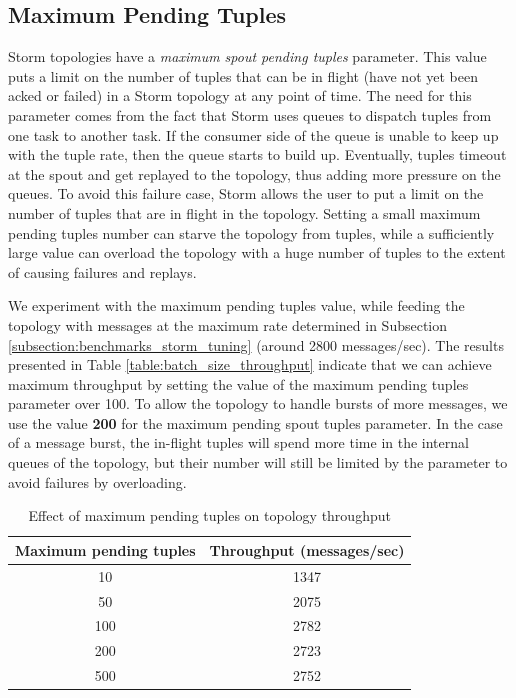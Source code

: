 \subsection{Maximum Pending Tuples}

Storm topologies have a \emph{maximum spout pending tuples} parameter. This value puts a limit on the number of tuples that can be in flight (have not yet been acked or failed) in a Storm topology at any point of time. The need for this parameter comes from the fact that Storm uses queues to dispatch tuples from one task to another task. If the consumer side of the queue is unable to keep up with the tuple rate, then the queue starts to build up. Eventually, tuples timeout at the spout and get replayed to the topology, thus adding more pressure on the queues. To avoid this failure case, Storm allows the user to put a limit on the number of tuples that are in flight in the topology. Setting a small maximum pending tuples number can starve the topology from tuples, while a sufficiently large value can overload the topology with a huge number of tuples to the extent of causing failures and replays. 

We experiment with the maximum pending tuples value, while feeding the topology with messages at the maximum rate determined in Subsection \ref{subsection:benchmarks_storm_tuning} (around 2800 messages/sec). The results presented in Table \ref{table:batch_size_throughput} indicate that we can achieve maximum throughput by setting the value of the maximum pending tuples parameter over 100. To allow the topology to handle bursts of more messages, we use the value \textbf{200} for the maximum pending spout tuples parameter. In the case of a message burst, the in-flight tuples will spend more time in the internal queues of the topology, but their number will still be limited by the parameter to avoid failures by overloading.

\begin{table}[H]
\centering
\begin{tabular}{ |c|c| }
\hline
Maximum pending tuples & Throughput (messages/sec) \\ \hline \hline
10 & 1347 \\ \hline
50 & 2075 \\ \hline
100 & 2782 \\ \hline
200 & 2723 \\ \hline
500 & 2752 \\ \hline
\end{tabular}
\caption{Effect of maximum pending tuples on topology throughput}
\label{table:max_pending_tuples}
\end{table}

